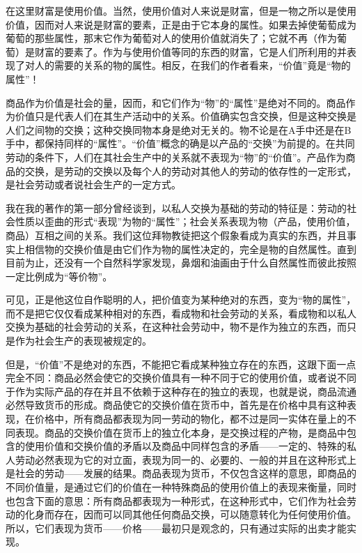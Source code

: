 在这里财富是使用价值。当然，使用价值对人来说是财富，但是一物之所以是使用价值，因而对人来说是财富的要素，正是由于它本身的属性。如果去掉使葡萄成为葡萄的那些属性，那末它作为葡萄对人的使用价值就消失了；它就不再（作为葡萄）是财富的要素了。作为与使用价值等同的东西的财富，它是人们所利用的并表现了对人的需要的关系的物的属性。相反，在我们的作者看来，“价值”竟是“物的属性”！

商品作为价值是社会的量，因而，和它们作为“物”的“属性”是绝对不同的。商品作为价值只是代表人们在其生产活动中的关系。价值确实包含交换，但是这种交换是人们之间物的交换；这种交换同物本身是绝对无关的。物不论是在A手中还是在B手中，都保持同样的“属性”。“价值”概念的确是以产品的“交换”为前提的。在共同劳动的条件下，人们在其社会生产中的关系就不表现为“物”的“价值”。产品作为商品的交换，是劳动的交换以及每个人的劳动对其他人的劳动的依存性的一定形式，是社会劳动或者说社会生产的一定方式。

我在我的著作的第一部分曾经谈到，以私人交换为基础的劳动的特征是：劳动的社会性质以歪曲的形式“表现”为物的“属性”；社会关系表现为物（产品，使用价值，商品）互相之间的关系。我们这位拜物教徒把这个假象看成为真实的东西，并且事实上相信物的交换价值是由它们作为物的属性决定的，完全是物的自然属性。直到目前为止，还没有一个自然科学家发现，鼻烟和油画由于什么自然属性而彼此按照一定比例成为“等价物”。

可见，正是他这位自作聪明的人，把价值变为某种绝对的东西，变为“物的属性”，而不是把它仅仅看成某种相对的东西，看成物和社会劳动的关系，看成物和以私人交换为基础的社会劳动的关系，在这种社会劳动中，物不是作为独立的东西，而只是作为社会生产的表现被规定的。

但是，“价值”不是绝对的东西，不能把它看成某种独立存在的东西，这跟下面一点完全不同：商品必然会使它的交换价值具有一种不同于它的使用价值，或者说不同于作为实际产品的存在并且不依赖于这种存在的独立的表现，也就是说，商品流通必然导致货币的形成。商品使它的交换价值在货币中，首先是在价格中具有这种表现，在价格中，所有商品都表现为同一劳动的物化，都不过是同一实体在量上的不同表现。商品的交换价值在货币上的独立化本身，是交换过程的产物，是商品中包含的使用价值和交换价值的矛盾以及商品中同样包含的矛盾——一定的、特殊的私人劳动必然表现为它的对立面，表现为同一的、必要的、一般的并且在这种形式上是社会的劳动——发展的结果。商品表现为货币，不仅包含这样的意思，即商品的不同价值量，是通过它们的价值在一种特殊商品的使用价值上的表现来衡量，同时也包含下面的意思：所有商品都表现为一种形式，在这种形式中，它们作为社会劳动的化身而存在，因而可以同其他任何商品交换，可以随意转化为任何使用价值。所以，它们表现为货币——价格——最初只是观念的，只有通过实际的出卖才能实现。

